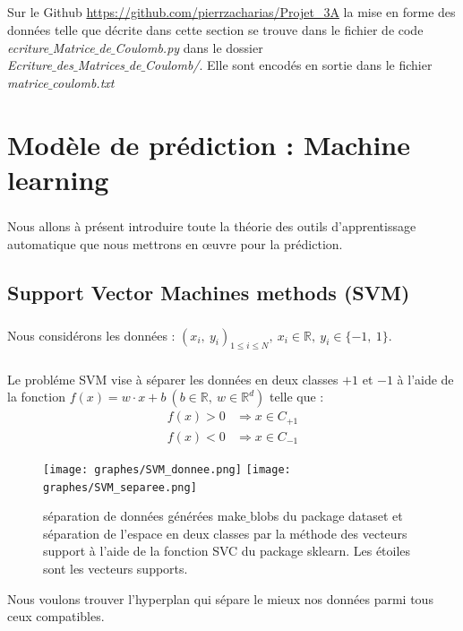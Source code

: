 \documentclass[a4paper,12pt,titlepage]{report}
\begin{document}
\paragraph{}
Sur le Github \url{https://github.com/pierrzacharias/Projet_3A} la mise en 
forme des données telle que décrite dans cette section se trouve dans le 
fichier de code \textit{ecriture{$\_$}Matrice{$\_$}de{$\_$}Coulomb.py} dans le dossier \\
\textit{Ecriture{$\_$}des{$\_$}Matrices{$\_$}de{$\_$}Coulomb/}. Elle sont encodés en sortie 
dans le fichier \textit{matrice{$\_$}coulomb.txt}
\chapter{Modèle de prédiction : Machine learning}
\label{C1}
\paragraph{}
Nous allons à présent introduire toute la théorie des outils d'apprentissage automatique que nous mettrons en œuvre pour la prédiction.
\section{Support Vector Machines methods (SVM)}
\paragraph{}
\paragraph{}
Nous considérons les données : $(x_{i},\ y_{i})_{1 \leqslant i \leqslant N},\ x_{i} \in \mathbb{R}, \ y_{i} \in \{-1,\ 1\}$.
\paragraph{}
Le probléme SVM vise à séparer les données  en deux classes $+1$ et $-1$ à l'aide de la fonction $f(x) = w \cdot x + b \ (b \in \mathbb{R},\ w \in  \mathbb{R}^{d})$ telle que :
\[ \begin{aligned}
	f(x) > 0 &\Rightarrow x \in C_{+1} \\
	f(x) < 0 &\Rightarrow x \in C_{-1} 
	\end{aligned}
\]

\begin{figure}[!h]
	\begin{center}
	\centering	
		\texttt{[image: graphes/SVM\_donnee.png]}
		\texttt{[image: graphes/SVM\_separee.png]}
		\caption{séparation de données générées make$\_$blobs du package dataset et séparation de l'espace en deux classes par la méthode des vecteurs support à l'aide de la fonction SVC du package sklearn. Les étoiles sont les vecteurs supports.}
	\end{center}
\end{figure}
Nous voulons trouver l'hyperplan qui sépare le mieux nos données parmi tous ceux compatibles.
\end{document}
